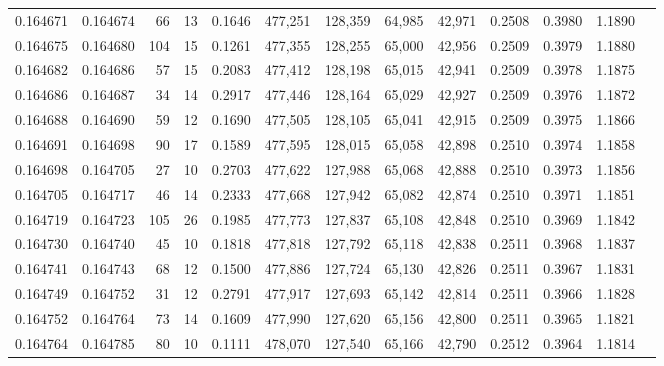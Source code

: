 \begin{tabular}{rrrrrrrrrrrrr}
0.164671 & 0.164674 &    66 &  13 &                                     0.1646 & 477,251 & 128,359 &  64,985 &  42,971 & 0.2508 & 0.3980 & 1.1890 \\
0.164675 & 0.164680 &   104 &  15 &                                     0.1261 & 477,355 & 128,255 &  65,000 &  42,956 & 0.2509 & 0.3979 & 1.1880 \\
0.164682 & 0.164686 &    57 &  15 &                                     0.2083 & 477,412 & 128,198 &  65,015 &  42,941 & 0.2509 & 0.3978 & 1.1875 \\
0.164686 & 0.164687 &    34 &  14 &                                     0.2917 & 477,446 & 128,164 &  65,029 &  42,927 & 0.2509 & 0.3976 & 1.1872 \\
0.164688 & 0.164690 &    59 &  12 &                                     0.1690 & 477,505 & 128,105 &  65,041 &  42,915 & 0.2509 & 0.3975 & 1.1866 \\
0.164691 & 0.164698 &    90 &  17 &                                     0.1589 & 477,595 & 128,015 &  65,058 &  42,898 & 0.2510 & 0.3974 & 1.1858 \\
0.164698 & 0.164705 &    27 &  10 &                                     0.2703 & 477,622 & 127,988 &  65,068 &  42,888 & 0.2510 & 0.3973 & 1.1856 \\
0.164705 & 0.164717 &    46 &  14 &                                     0.2333 & 477,668 & 127,942 &  65,082 &  42,874 & 0.2510 & 0.3971 & 1.1851 \\
0.164719 & 0.164723 &   105 &  26 &                                     0.1985 & 477,773 & 127,837 &  65,108 &  42,848 & 0.2510 & 0.3969 & 1.1842 \\
0.164730 & 0.164740 &    45 &  10 &                                     0.1818 & 477,818 & 127,792 &  65,118 &  42,838 & 0.2511 & 0.3968 & 1.1837 \\
0.164741 & 0.164743 &    68 &  12 &                                     0.1500 & 477,886 & 127,724 &  65,130 &  42,826 & 0.2511 & 0.3967 & 1.1831 \\
0.164749 & 0.164752 &    31 &  12 &                                     0.2791 & 477,917 & 127,693 &  65,142 &  42,814 & 0.2511 & 0.3966 & 1.1828 \\
0.164752 & 0.164764 &    73 &  14 &                                     0.1609 & 477,990 & 127,620 &  65,156 &  42,800 & 0.2511 & 0.3965 & 1.1821 \\
0.164764 & 0.164785 &    80 &  10 &                                     0.1111 & 478,070 & 127,540 &  65,166 &  42,790 & 0.2512 & 0.3964 & 1.1814 \\

\end{tabular}
